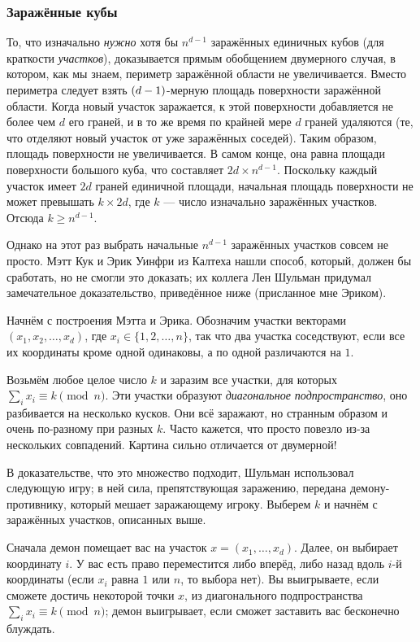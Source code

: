 \subsubsection*{Заражённые кубы}

То, что изначально \emph{нужно} хотя бы $n^{d-1}$ заражённых единичных кубов (для краткости \emph{участков}), доказывается прямым обобщением двумерного случая, в котором, как мы знаем, периметр заражённой области не увеличивается.
Вместо периметра следует взять $(d\z-1)$-мерную площадь поверхности заражённой области.
Когда новый участок заражается, к этой поверхности добавляется не более чем $d$ его граней,
и в то же время по крайней мере $d$ граней удаляются (те, что отделяют новый участок от уже заражённых соседей).
Таким образом, площадь поверхности не увеличивается.
В самом конце, она равна площади поверхности большого куба, что составляет $2d \times n^{d-1}$.
Поскольку каждый участок имеет $2d$ граней единичной площади,
начальная площадь поверхности не может превышать $k \times 2d$,
где $k$ --- число изначально заражённых участков.
Отсюда $k\geqslant n^{d-1}$.

Однако на этот раз выбрать начальные $n^{d-1}$ заражённых участков совсем не просто.
Мэтт Кук и Эрик Уинфри из Калтеха нашли способ, который, должен бы сработать, но не смогли это доказать;
их коллега Лен Шульман придумал замечательное доказательство, приведённое ниже (присланное мне Эриком).

Начнём с построения Мэтта и Эрика.
Обозначим участки векторами $(x_1 , x_2 , \dots , x_d )$, где $x_i \in \{1, 2, \dots , n\}$, так что два участка соседствуют, 
если все их координаты кроме одной одинаковы, а по одной различаются на $1$.

Возьмём любое целое число $k$ и заразим все участки, для которых $\sum_i x_i \equiv k\pmod n$.
Эти участки образуют \emph{диагональное подпространство}, оно разбивается на несколько кусков.
Они всё заражают, но странным образом и очень по-разному при разных $k$.
Часто кажется, что просто повезло из-за нескольких совпадений.
Картина сильно отличается от двумерной!

В доказательстве, что это множество подходит, Шульман использовал следующую игру;
в ней сила, препятствующая заражению, передана демону-противнику, который мешает заражающему игроку.
Выберем $k$ и начнём с заражённых участков, описанных выше.

Сначала демон помещает вас на участок $x = (x_1, \dots,x_d )$.
Далее, он выбирает координату $i$.
У вас есть право переместится либо вперёд, либо назад вдоль $i$-й координаты (если $x_i$ равна $1$ или $n$, то выбора нет).
Вы выигрываете, если сможете достичь некоторой точки $x$, из диагонального подпространства $\sum_i x_i \equiv k\pmod n$;
демон выигрывает, если сможет заставить вас бесконечно блуждать.

